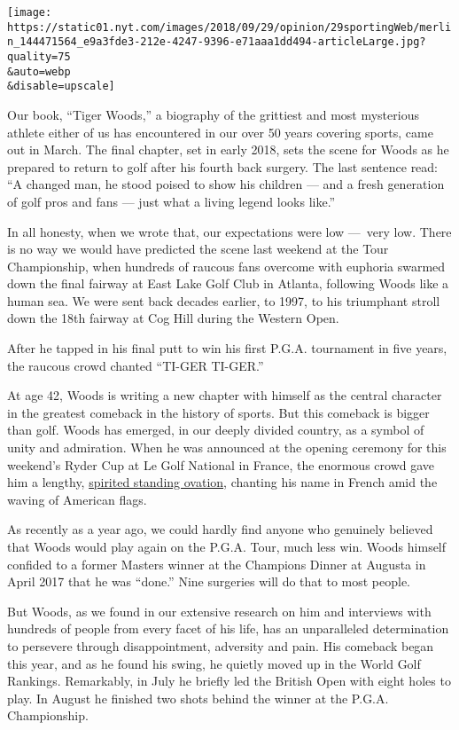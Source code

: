 \texttt{[image: https://static01.nyt.com/images/2018/09/29/opinion/29sportingWeb/merlin\_144471564\_e9a3fde3-212e-4247-9396-e71aaa1dd494-articleLarge.jpg?quality=75\\\&auto=webp\\\&disable=upscale]}

Our book, ``Tiger Woods,'' a biography of the grittiest and most
mysterious athlete either of us has encountered in our over 50 years
covering sports, came out in March. The final chapter, set in early
2018, sets the scene for Woods as he prepared to return to golf after
his fourth back surgery. The last sentence read: ``A changed man, he
stood poised to show his children --- and a fresh generation of golf
pros and fans --- just what a living legend looks like.''

In all honesty, when we wrote that, our expectations were low ---~very
low. There is no way we would have predicted the scene last weekend at
the Tour Championship, when hundreds of raucous fans overcome with
euphoria swarmed down the final fairway at East Lake Golf Club in
Atlanta, following Woods like a human sea. We were sent back decades
earlier, to 1997, to his triumphant stroll down the 18th fairway at Cog
Hill during the Western Open.

After he tapped in his final putt to win his first P.G.A. tournament in
five years, the raucous crowd chanted ``TI-GER TI-GER.''

At age 42, Woods is writing a new chapter with himself as the central
character in the greatest comeback in the history of sports. But this
comeback is bigger than golf. Woods has emerged, in our deeply divided
country, as a symbol of unity and admiration. When he was announced at
the opening ceremony for this weekend's Ryder Cup at Le Golf National in
France, the enormous crowd gave him a lengthy,
\href{https://www.golfdigest.com/story/ryder-cup-2018-watch-tiger-woods-get-a-long-standing-ovation-at-ryder-cup-opening-ceremony}{spirited
standing ovation}, chanting his name in French amid the waving of
American flags.

As recently as a year ago, we could hardly find anyone who genuinely
believed that Woods would play again on the P.G.A. Tour, much less win.
Woods himself confided to a former Masters winner at the Champions
Dinner at Augusta in April 2017 that he was ``done.'' Nine surgeries
will do that to most people.

But Woods, as we found in our extensive research on him and interviews
with hundreds of people from every facet of his life, has an
unparalleled determination to persevere through disappointment,
adversity and pain. His comeback began this year, and as he found his
swing, he quietly moved up in the World Golf Rankings. Remarkably, in
July he briefly led the British Open with eight holes to play. In August
he finished two shots behind the winner at the P.G.A. Championship.


